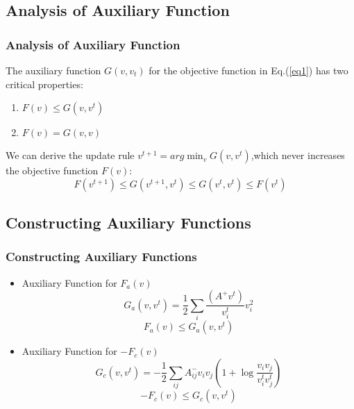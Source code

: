 \documentclass{beamer}
\begin{document}
\subsection{Analysis of Auxiliary Function}
\begin{frame}\frametitle{Analysis of Auxiliary Function}
The auxiliary function $G(v,v_t)$ for the objective function in Eq.(\ref{eq1}) has two critical properties:
\begin{enumerate}
\item $F(v)\leq G(v,v^t)$
\item $F(v)=G(v,v)$
\end{enumerate}
We can derive the update rule $v^{t+1}=arg \min_v G(v,v^t)$,which never increases the objective function $F(v)$:
\begin{equation}\label{eq9}
F(v^{t+1})\leq G(v^{t+1},v^t)\leq G(v^t,v^t)\leq F(v^t)
\end{equation}
\end{frame}

\subsection{Constructing Auxiliary Functions}
\begin{frame}\frametitle{Constructing Auxiliary Functions}
\begin{itemize}
\item Auxiliary Function for $F_a(v)$
\begin{equation}\label{eq10}
G_a(v,v^t)=\frac{1}{2}\sum_i \frac{(A^+v^t)}{v_i^t}v_i^2
\end{equation}
\begin{equation}\label{eq12}
F_a(v)\leq G_a(v,v^t)
\end{equation}
\item Auxiliary Function for $-F_c(v)$
\begin{equation}\label{eq13}
G_c(v,v^t)=-\frac{1}{2}\sum_{ij}A_{ij}^-v_iv_j(1+\log\frac{v_iv_j}{v_i^tv_j^t})
\end{equation}
\begin{equation}\label{eq14}
-F_c(v)\leq G_c(v,v^t)
\end{equation}
\end{itemize}
\end{frame}
\end{document}
